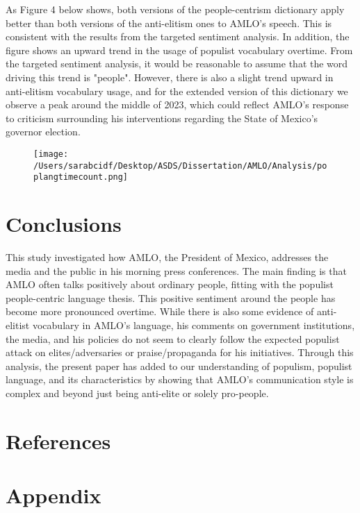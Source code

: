 \documentclass[]{article}
\begin{document}
As Figure 4 below shows, both versions of the people-centrism dictionary apply better than both versions of the anti-elitism ones to AMLO's speech. This is consistent with the results from the targeted sentiment analysis. In addition, the figure shows an upward trend in the usage of populist vocabulary overtime. From the targeted sentiment analysis, it would be reasonable to assume that the word driving this trend is "people". However, there is also a slight trend upward in anti-elitism vocabulary usage, and for the extended version of this dictionary we observe a peak around the middle of 2023, which could reflect AMLO's response to criticism surrounding his interventions regarding the State of Mexico's governor election. 

\begin{figure}[H]
	\centering
	\caption{\label{}}
	\texttt{[image: /Users/sarabcidf/Desktop/ASDS/Dissertation/AMLO/Analysis/poplangtimecount.png]}
\end{figure}

\section{Conclusions}

This study investigated how AMLO, the President of Mexico, addresses the media and the public in his morning press conferences. The main finding is that AMLO often talks positively about ordinary people, fitting with the populist people-centric language thesis. This positive sentiment around the people has become more pronounced overtime. While there is also some evidence of anti-elitist vocabulary in AMLO's language, his comments on government institutions, the media, and his policies do not seem to clearly follow the expected populist attack on elites/adversaries or praise/propaganda for his initiatives. Through this analysis, the present paper has added to our understanding of populism, populist language, and its characteristics by showing that AMLO's communication style is complex and beyond just being anti-elite or solely pro-people. 

\section{References}




\vspace{.5cm}
\section{Appendix}
\end{document}
